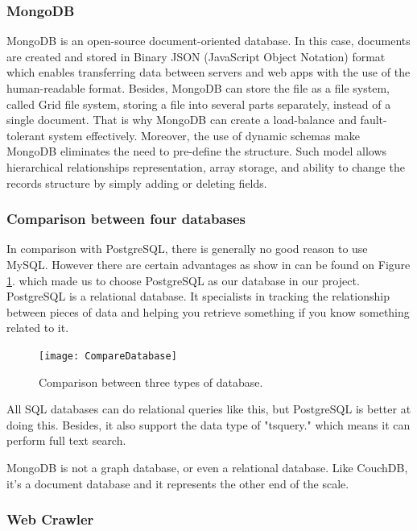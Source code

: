 \subsubsection{MongoDB}
MongoDB is an open-source document-oriented database. 
In this case, documents are created and stored in Binary JSON (JavaScript Object Notation) format which enables transferring data between servers and web apps with the use of the human-readable format. 
Besides, MongoDB can store the file as a file system, called Grid file system, 
storing a file into several parts separately, instead of a single document. 
That is why MongoDB can create a load-balance and fault-tolerant system effectively. 
Moreover, the use of dynamic schemas make MongoDB eliminates the need to pre-define the structure. 
Such model allows hierarchical relationships representation, array storage, and ability to change the records structure by simply adding or deleting fields.


\subsubsection{Comparison between four databases}
In comparison with PostgreSQL, there is generally no good reason to use MySQL. 
However there are certain advantages as show in can be found on Figure \ref{CompareDatabase}. which made us to choose PostgreSQL as our database in our project.
PostgreSQL is a relational database. 
It specialists in tracking the relationship between pieces of data and helping you retrieve something if you know something related to it.

\begin{figure}[htb]
	\begin{center}
		\texttt{[image: CompareDatabase]}
	\end{center}
	\caption{Comparison between three types of database.\label{CompareDatabase}}
\end{figure}
\newpage

All SQL databases can do relational queries like this, but PostgreSQL is better at doing this. 
Besides, it also support the data type of "tsquery." which means it can perform full text search.


MongoDB is not a graph database, or even a relational database. 
Like CouchDB, it's a document database and it represents the other end of the scale. 

\subsubsection{Web Crawler}

